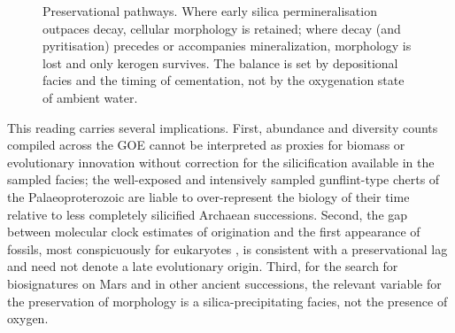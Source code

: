 \documentclass[11pt]{article}
\begin{document}
\begin{figure}[t]
\centering
{}
\caption{Preservational pathways. Where early silica permineralisation outpaces decay, cellular
morphology is retained; where decay (and pyritisation) precedes or accompanies mineralization,
morphology is lost and only kerogen survives. The balance is set by depositional facies and the
timing of cementation, not by the oxygenation state of ambient water.}
\label{fig:model}
\end{figure}

This reading carries several implications. First, abundance and diversity counts compiled across the
GOE cannot be interpreted as proxies for biomass or evolutionary innovation without correction for
the silicification available in the sampled facies; the well-exposed and intensively sampled
gunflint-type cherts of the Palaeoproterozoic are liable to over-represent the biology of their time
relative to less completely silicified Archaean successions. Second, the gap between molecular clock
estimates of origination and the first appearance of fossils, most conspicuously for eukaryotes
\citep{Betts2018}, is consistent with a preservational lag and need not denote a late evolutionary
origin. Third, for the search for biosignatures on Mars and in other ancient successions, the
relevant variable for the preservation of morphology is a silica-precipitating facies, not the
presence of oxygen.
\end{document}
